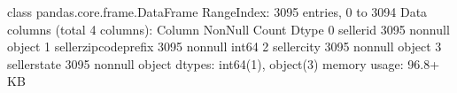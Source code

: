 \documentclass[letterpaper,10pt,english]{jupyterBook}
\begin{document}
\begin{sphinxVerbatim}[commandchars=\\\{\}]
\end{sphinxVerbatim}

\begin{sphinxVerbatim}[commandchars=\\\{\}]
\PYGZlt{}class \PYGZsq{}pandas.core.frame.DataFrame\PYGZsq{}\PYGZgt{}
RangeIndex: 3095 entries, 0 to 3094
Data columns (total 4 columns):
 \PYGZsh{}   Column                  Non\PYGZhy{}Null Count  Dtype 
\PYGZhy{}\PYGZhy{}\PYGZhy{}  \PYGZhy{}\PYGZhy{}\PYGZhy{}\PYGZhy{}\PYGZhy{}\PYGZhy{}                  \PYGZhy{}\PYGZhy{}\PYGZhy{}\PYGZhy{}\PYGZhy{}\PYGZhy{}\PYGZhy{}\PYGZhy{}\PYGZhy{}\PYGZhy{}\PYGZhy{}\PYGZhy{}\PYGZhy{}\PYGZhy{}  \PYGZhy{}\PYGZhy{}\PYGZhy{}\PYGZhy{}\PYGZhy{} 
 0   seller\PYGZus{}id               3095 non\PYGZhy{}null   object
 1   seller\PYGZus{}zip\PYGZus{}code\PYGZus{}prefix  3095 non\PYGZhy{}null   int64 
 2   seller\PYGZus{}city             3095 non\PYGZhy{}null   object
 3   seller\PYGZus{}state            3095 non\PYGZhy{}null   object
dtypes: int64(1), object(3)
memory usage: 96.8+ KB
\end{sphinxVerbatim}

\begin{sphinxVerbatim}[commandchars=\\\{\}]
\PYG{p}{[}\PYG{p}{]}  \PYG{p}{[}\PYG{p}{]}
\PYG{p}{[}\PYG{p}{]}  \PYG{p}{[}\PYG{p}{]}
\end{sphinxVerbatim}
\end{document}
